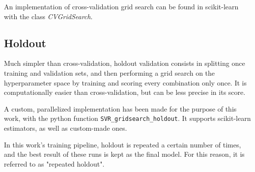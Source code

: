 \documentclass[12pt]{report}
\begin{document}
An implementation of cross-validation grid search can be found in scikit-learn with the class \textit{CVGridSearch}.

\subsection*{Holdout}
Much simpler than cross-validation, holdout validation consists in splitting once training and validation sets, and then performing a grid search on the hyperparameter space by training and scoring every combination only once. It is computationally easier than cross-validation, but can be less precise in its score.

A custom, parallelized implementation has been made for the purpose of this work, with the python function \texttt{SVR\_gridsearch\_holdout}. It supports scikit-learn estimators, as well as custom-made ones.

In this work's training pipeline, holdout is repeated a certain number of times, and the best result of these runs is kept as the final model. For this reason, it is referred to as "repeated holdout".
\end{document}
